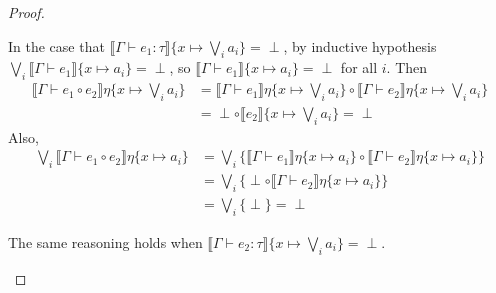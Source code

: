 \begin{proof}
\begin{itemize}
  In the case that $\llbracket \Gamma \vdash e_1:\tau\rrbracket\{x\mapsto \bigvee_i a_i\} = \perp$, by inductive
  hypothesis $\bigvee_i \llbracket \Gamma \vdash e_1 \rrbracket\{x\mapsto a_i\} = \perp$, so 
  $ \llbracket \Gamma \vdash e_1 \rrbracket\{x\mapsto a_i\} = \perp$ for all $i$. Then
  \begin{align*}
  \llbracket \Gamma \vdash e_1 \circ e_2\rrbracket\eta\{x \mapsto \bigvee_i a_i\}
  &=  \llbracket \Gamma \vdash e_1 \rrbracket\eta\{x \mapsto \bigvee_i a_i\} \circ
  \llbracket \Gamma \vdash e_2 \rrbracket\eta\{x \mapsto \bigvee_i a_i\}\\
  &= \perp \circ \llbracket e_2\rrbracket\{x\mapsto\bigvee_i a_i\} = \perp 
  \end{align*}
  Also,
  \begin{align*}
  \bigvee_i \llbracket \Gamma \vdash e_1 \circ e_2\rrbracket\eta\{x \mapsto a_i\}
  &= \bigvee_i \{ \llbracket \Gamma \vdash e_1 \rrbracket\eta\{x \mapsto a_i\} \circ
  \llbracket \Gamma \vdash e_2 \rrbracket\eta\{x \mapsto a_i\}\} \\
  &=\bigvee_i \{ \perp \circ
  \llbracket \Gamma \vdash e_2 \rrbracket\eta\{x \mapsto a_i\}\} \\
  &= \bigvee_i\{ \perp \} = \perp
  \end{align*}

  The same reasoning holds when $\llbracket \Gamma \vdash e_2:\tau\rrbracket\{x\mapsto \bigvee_i a_i\} = \perp$.
  

\end{itemize}
\end{proof}
